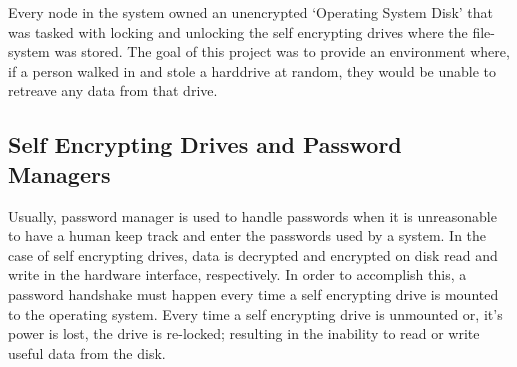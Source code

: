 \documentclass[11pt]{article} %
\def\pm{password manager\xspace}
\def\sed{self encrypting drive\xspace}
\def\seds{\sed{s}\xspace}
\begin{document}
\begin{center}
\end{center}

Every node in the system owned an unencrypted `Operating System Disk' that was tasked with locking and unlocking the \seds where the file-system was stored. The goal of this project was to provide an environment where, if a person walked in and stole a harddrive at random, they would be unable to retreave any data from that drive. 

\subsection*{Self Encrypting Drives and Password Managers}

Usually, \pm is used to handle passwords when it is unreasonable to have a human keep track and enter the passwords used by a system. In the case of \seds, data is decrypted and encrypted on disk read and write in the hardware interface, respectively. In order to accomplish this, a password handshake must happen every time a \sed is mounted to the operating system. Every time a \sed is unmounted or, it's power is lost, the drive is re-locked; resulting in the inability to read or write useful data from the disk.
\end{document}
